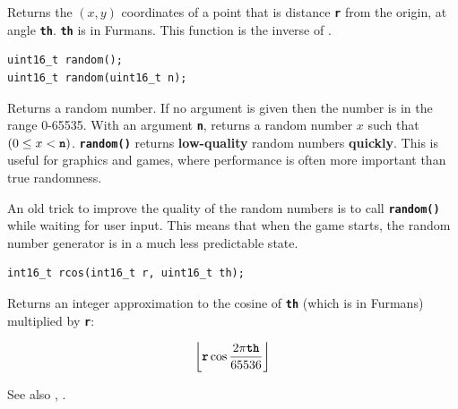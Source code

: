 \documentclass[10pt]{book}
\newcommand{\mach}[1]{\texttt{\textbf{#1}}}
\begin{document}
\begin{center}
\end{center}

Returns the $(x,y)$ coordinates of a point that is distance \mach{r} from the origin,
at angle \mach{th}.
\mach{th} is in Furmans.
This function is the inverse of .


\begin{framed}
\begin{verbatim}
uint16_t random();
uint16_t random(uint16_t n);
\end{verbatim}
\end{framed}

Returns a random number. If no argument is given then the number is in the range 0-65535.
With an argument \mach{n}, returns a random number $x$ such that $(0 \le x < \mach{n})$.
\mach{random()} returns \textbf{low-quality} random numbers \textbf{quickly}.
This is useful for graphics and games, where performance is often more important than true randomness.

An old trick to improve the quality of the random numbers is to call \mach{random()} while waiting 
for user input.
This means that when the game starts, the random number generator is in a much less predictable state.

\newpage
{}

\begin{framed}
\begin{verbatim}
int16_t rcos(int16_t r, uint16_t th);
\end{verbatim}
\end{framed}

Returns an integer approximation to the cosine of \mach{th} (which is in Furmans) multiplied by \mach{r}:

\[
  \left\lfloor \mach{r} \cos \frac{2 \pi \mach{th}}{65536} \right\rfloor
\]

\noindent
See also , .
\end{document}
